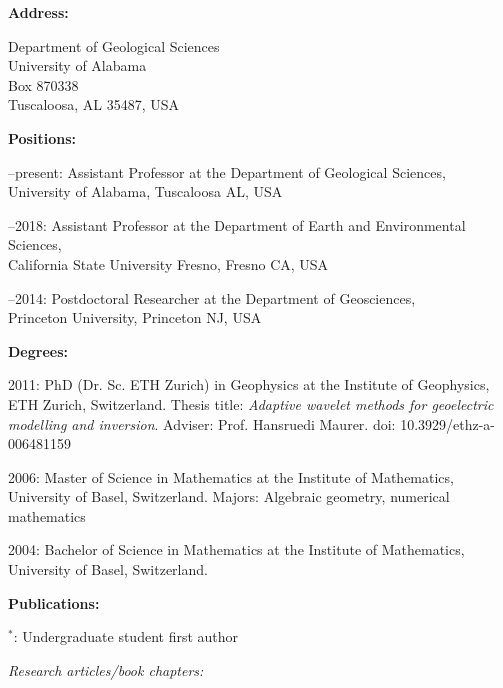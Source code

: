\documentclass[10pt]{article}
\begin{document}
\spc
\textbf{\tsize Address:}

\spcp
Department of Geological Sciences\\
University of Alabama\\
Box 870338\\
Tuscaloosa, AL 35487, USA



\spc
\textbf{\tsize Positions:}

--present:
Assistant Professor at the Department of Geological Sciences, \\University of Alabama, Tuscaloosa AL, USA

--2018:
Assistant Professor at the Department of Earth and Environmental Sciences, \\California State University Fresno, Fresno CA, USA

--2014:
Postdoctoral Researcher at the Department of Geosciences, \\Princeton University, Princeton NJ, USA


\spc
\textbf{\tsize Degrees:}

\spcp
\par{2011:} PhD (Dr. Sc. ETH Zurich) in Geophysics at the Institute of Geophysics,
ETH Zurich, Switzerland.
Thesis title: \emph{ Adaptive wavelet methods for geoelectric modelling and inversion}.
Adviser: Prof. Hansruedi Maurer.
doi: 10.3929/ethz-a-006481159

\spcp
\par{2006:} Master of Science in Mathematics at the Institute of Mathematics,
 University of Basel, Switzerland.
 Majors: Algebraic geometry, numerical mathematics

 \spcp
\par{ 2004:} Bachelor of Science in Mathematics at the Institute of Mathematics, 
University of Basel, Switzerland.



\spc
\textbf{\tsize Publications:}

\spcp
$^*$: Undergraduate student first author

\spcp
\emph{Research articles/book chapters:}
\end{document}
